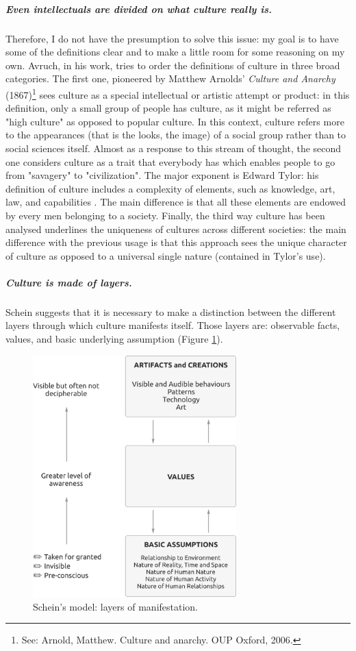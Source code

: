 \documentclass[../main.tex]{subfiles}
\begin{document}
\subparagraph{Even intellectuals are divided on what culture really is.} Therefore, I do not have the presumption to solve this issue: my goal is to have some of the definitions clear and to make a little room for some reasoning on my own. Avruch, in his work, tries to order the definitions of culture in three broad categories. The first one, pioneered by Matthew Arnolds' \textit{Culture and Anarchy} (1867)\footnote{See: Arnold, Matthew. Culture and anarchy. OUP Oxford, 2006.} sees culture as a special intellectual or artistic attempt or product: in this definition, only a small group of people has culture, as it might be referred as "high culture" as opposed to popular culture. In this context, culture refers more to the appearances (that is the looks, the image) of a social group rather than to social sciences itself. Almost as a response to this stream of thought, the second one considers culture as a trait that everybody has which enables people to go from "savagery" to "civilization". The major exponent is Edward Tylor: his definition of culture includes a complexity of elements, such as knowledge, art, law, and capabilities \mancite\autocite[1]{tylor}. The main difference is that all these elements are endowed by every men belonging to a society. Finally, the third way culture has been analysed underlines the uniqueness of cultures across different societies: the main difference with the previous usage is that this approach sees the unique character of culture as opposed to a universal single nature (contained in Tylor's use).

\subparagraph*{Culture is made of layers.} Schein %
suggests that it is necessary to make a distinction between the different layers through which culture manifests itself. Those layers are: observable facts, values, and basic underlying assumption (Figure \ref{fig:schein}).
\begin{figure}[h]
    \centering\includegraphics[width=0.7\textwidth]{images/values}
    \caption{Schein's model: layers of manifestation.} %
    \label{fig:schein}
\end{figure}
\end{document}
